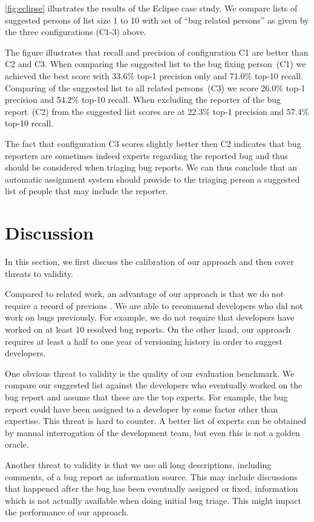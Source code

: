 \documentclass[10pt]{book}
\begin{document}
\autoref{fig:eclipse} illustrates the results of the Eclipse case study. We compare lists of suggested persons of list size 1 to 10 with set of ``bug related persons'' as given by the three configurations (C1-3) above.

The figure illustrates that recall and precision of configuration C1 are better than C2 and C3. When comparing the suggested list to the bug fixing person~(C1) we achieved the best score with 33.6\% top-1 precision only and 71.0\% top-10 recall. Comparing of the suggested list to all related persons~(C3) we score 26.0\% top-1 precision and 54.2\% top-10 recall. When excluding the reporter of the bug report~(C2) from the suggested list scores are at 22.3\% top-1 precision and 57.4\% top-10 recall.

The fact that configuration C3 scores slightly better then C2 indicates that bug reporters are sometimes indeed experts regarding the reported bug and thus should be considered when triaging bug reports. We can thus conclude that an automatic assignment system should provide to the triaging person a suggested list of people that may include the reporter.

\section{Discussion}\label{sec:discussion}

In this section, we first discuss the calibration of our approach and then cover threats to validity.

Compared to related work, an advantage of our approach is that we do not require a record of previous \BRs. We are able to recommend developers who did not work on bugs previously. For example, we do not require that developers have worked on at least 10 resolved bug reports. On the other hand, our approach requires at least a half to one year of versioning history in order to suggest developers. 

One obvious threat to validity is the quality of our evaluation benchmark. We compare our suggested list against the developers who eventually worked on the bug report and assume that these are the top experts. For example, the bug report could have been assigned to a developer by some factor other than expertise. This threat is hard to counter. A better list of experts can be obtained by manual interrogation of the development team, but even this is not a golden oracle.

Another threat to validity is that we use all long descriptions, including comments, of a bug report as information source. This may include discussions that happened after the bug has been eventually assigned or fixed, information which is not actually available when doing initial bug triage. This might impact the performance of our approach. 
\end{document}
